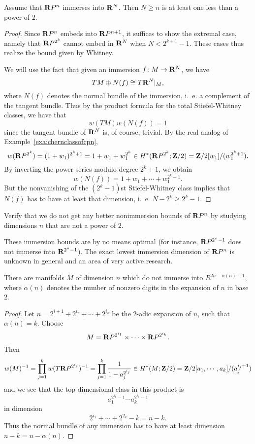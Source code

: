 \documentclass[a4paper,openany]{scrbook}
\begin{document}
\begin{thm}
Assume that $\mathbf R P^n$ immerses into $\mathbf R^N$. Then $N\geq n$ is at least one less than a power of $2$.
\end{thm}
\begin{proof}
Since $\mathbf R P^n$ embeds into $\mathbf R P^{n+1}$, it suffices to show the extremal case, namely that $\mathbf R P^{2^k}$ cannot embed in $\mathbf R^N$ when $N<2^{k+1}-1$. These cases thus realize the bound given by Whitney.

We will use the fact that given an immersion $f\colon M \to \mathbf R^N$, we have
\[
TM \oplus N(f) \cong T\mathbf R^N|_M,
\]
where $N(f)$ denotes the normal bundle of the immersion, i.~e. a complement of the tangent bundle. Thus by the product formula for the total Stiefel-Whitney classes, we have that
\[
w(TM) w(N(f)) = 1
\]
since the tangent bundle of $\mathbf R^N$ is, of course, trivial. By the real analog of Example~\ref{exa:chernclassofcpn},
\[
w(\mathbf R P^{2^k}) = (1+w_1)^{2^k+1} = 1+w_1+w_1^{2^k} \in H^*(\mathbf R P^{2^k};\mathbf Z/2) = \mathbf Z/2[w_1]/(w_1^{2^k+1}).
\]
By inverting the power series modulo degree $2^k+1$, we obtain
\[
w(N(f)) = 1+w_1+\cdots+w_1^{2^k-1}.
\]
But the nonvanishing of the $(2^k-1)$st Stiefel-Whitney class implies that $N(f)$ has to have at least that dimension, i.~e. $N-2^k \geq 2^k-1$.
\end{proof}

\begin{exer}\label{exer:nobetternonimmersion}
Verify that we do not get any better nonimmersion bounds of $\mathbf R P^n$ by studying dimensions $n$ that are not a power of $2$.
\end{exer}

These immersion bounds are by no means optimal (for instance, $\mathbf R P^{2^n-1}$ does not immerse into $\mathbf R^{2^n-1}$). The exact lowest immersion dimension of $\mathbf R P^n$ is unknown in general and an area of very active research.

\begin{thm}
There are manifolds $M$ of dimension $n$ which do not immerse into $R^{2n-\alpha(n)-1}$, where $\alpha(n)$ denotes the number of nonzero digits in the expansion of $n$ in base $2$.
\end{thm}
\begin{proof}
Let $n=2^{i+1}+2^{i_2}+\cdots+2^{i_k}$ be the $2$-adic expansion of $n$, such that $\alpha(n)=k$. Choose
\[
M= \mathbf R P^{2^{i_1}} \times \cdots \times \mathbf R P^{2^{i_k}}.
\]
Then
\[
w(M)^{-1} = \prod_{j=1}^k w(T\mathbf R P^{2^{i_j}})^{-1} = \prod_{j=1}^k \frac1{1-a_j^{2^{i_j}}} \in H^*(M;\mathbf Z/2) = \mathbf Z/2[a_1,\cdots,a_k]/(a_j^{i_j+1})
\]
and we see that the top-dimensional class in this product is
\[
a_1^{2^{i_1}-1}\cdots a_k^{2^{i_k}-1}
\]
in dimension
\[
2^{i_1}+\cdots+2^{2_k}-k = n-k.
\]
Thus the normal bundle of any immersion has to have at least dimension $n-k=n-\alpha(n)$.
\end{proof}
\end{document}

